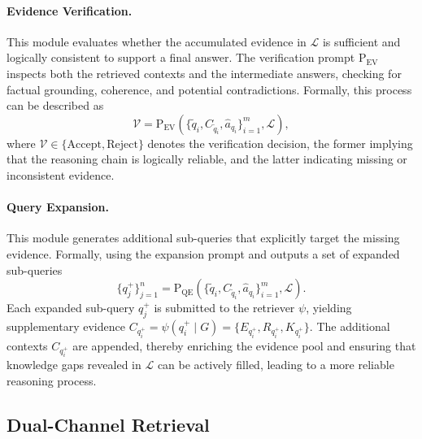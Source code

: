 \paragraph{Evidence Verification.}
This module evaluates whether the accumulated evidence in $\mathcal{L}$ is sufficient and logically consistent to support a final answer. The verification prompt $\mathrm{P}_{\mathrm{EV}}$ inspects both the retrieved contexts and the intermediate answers, checking for factual grounding, coherence, and potential contradictions. Formally, this process can be described as
\begin{equation}
    \mathcal{V} = \mathrm{P}_{\mathrm{EV}}(\{\tilde{q}_i, C_{\tilde{q}_i}, \hat{a}_{q_i}\}_{i=1}^m, \mathcal{L}),
\end{equation}
where $\mathcal{V} \in \{\mathrm{Accept}, \mathrm{Reject}\}$ denotes the verification decision, the former implying that the reasoning chain is logically reliable, and the latter indicating missing or inconsistent evidence.

\paragraph{Query Expansion.}
This module generates additional sub-queries that explicitly target the missing evidence. Formally, using the expansion prompt and outputs a set of expanded sub-queries
\begin{equation}
    \{{q_j^{+}}\}_{j=1}^n = \mathrm{P}_{\mathrm{QE}}(\{\tilde{q}_i, C_{\tilde{q}_i}, \hat{a}_{q_i}\}_{i=1}^m, \mathcal{L}).
\end{equation}
Each expanded sub-query $q_j^{+}$ is submitted to the retriever $\psi$, yielding supplementary evidence $C_{q_i^{+}} = \psi(q_i^{+} \mid G) = \{E_{q_i^{+}}, R_{q_i^{+}}, K_{q_i^{+}}\}$. The additional contexts $C_{q_i^{+}}$ are appended, thereby enriching the evidence pool and ensuring that knowledge gaps revealed in $\mathcal{L}$ can be actively filled, leading to a more reliable reasoning process.


\subsection{Dual-Channel Retrieval}

